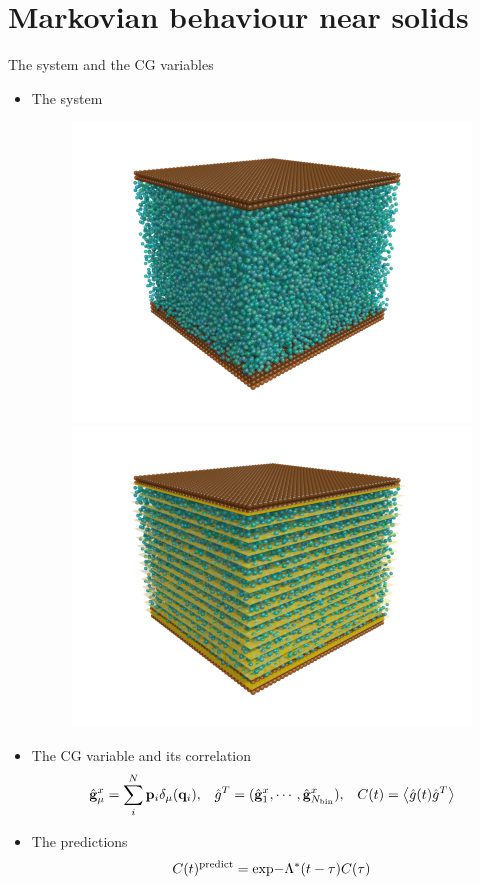 \documentclass{beamer}
\newcommand{\llangle}{\left\langle}
\newcommand{\rrangle}{\right\rangle}
\begin{document}
\section{Markovian behaviour near solids}
\begin{frame}{The system and the CG variables}
\begin{itemize}
  \item The system
\begin{figure}
    \centering
    \includegraphics[width=0.45\linewidth]{PRL3_gold2_wo_layers_wo_diffuse}
    \includegraphics[width=0.45\linewidth]{PRL3_gold2_wo_diffuse}
\end{figure}
\item The CG variable and its correlation
\begin{align}
  \hat{\bf g}^x_\mu= \sum_i^N{\bf p}_i\delta_\mu({\bf q}_i), && 
  \hat{g}^T=(\hat{\bf   g}^x_1,\cdots,\hat{\bf  g}^x_{N_{\rm   bin}}), &&
  C(t)=\llangle \hat{g}(t) \hat{g}^T\rrangle 
\nonumber
\end{align}

\item The predictions
\begin{align}
  C(t)^{\rm predict} = {\rm exp}{-\Lambda^*(t-\tau)}C(\tau)
  \nonumber
\end{align}
\end{itemize}
\end{frame}
\end{document}
